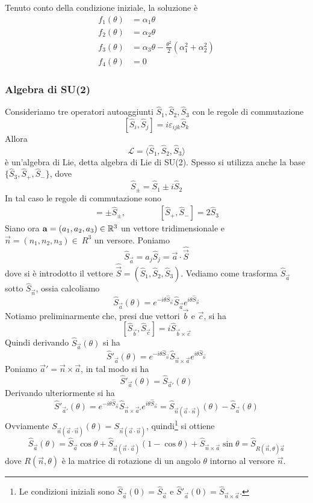 \documentclass[a4paper, 11pt]{article}
\newcommand{\op}[1]{\hat{#1}}
\renewcommand{\op}[1]{\hat{#1}}
\begin{document}
Tenuto conto della condizione iniziale, la soluzione è
\begin{align*}
	f_1(\theta)&=\alpha_1\theta\\f_2(\theta)&=\alpha_2\theta\\f_3(\theta)&=\alpha_3\theta-\frac{\theta^2}{2}(\alpha_1^2+\alpha_2^2)\\f_4(\theta)&=0
\end{align*}
\subsubsection{Algebra di SU(2)}
Consideriamo tre operatori autoaggiunti $\op S_1,\op S_2,\op S_3$ con le regole di commutazione
\[[\op S_i,\op S_j]=i\varepsilon_{ijk}\op S_k\]
Allora
\[\mathcal{L}=\langle\op S_1,\op S_2,\op S_3\rangle\]
è un'algebra di Lie, detta algebra di Lie di SU(2). Spesso si utilizza anche la base $\{\op S_3,\op S_+,\op S_-\}$, dove
\[\op S_\pm=\op S_1\pm i\op S_2\]
In tal caso le regole di commutazione sono
\begin{align*}
	[\op S_3,\op S_\pm]=\pm\op S_\pm,\qquad\qquad [\op S_+,\op S_-]=2\op S_3
\end{align*}
Siano ora $\mathbf{a}=(a_1,a_2,a_3)\in\mathbb{R} ^3$ un vettore tridimensionale e $\vec{n}=(n_1,n_2,n_3)\in\ R^3$ un versore. Poniamo
\[\op S_\vec{a}=a_j\op S_j=\vec{a}\cdot\op{\vec{S}}\]
dove si è introdotto il vettore $\op{\vec{S}}=(\op S_1,\op S_2,\op S_3)$. Vediamo come trasforma $\op S_\vec{a}$ sotto $\op S_\vec{n}$, ossia calcoliamo
\[\op S_\vec{a}(\theta)=e^{-i\theta\op S_\vec{n}}\op S_\vec{a}e^{i\theta\op S_\vec{n}}\]
Notiamo preliminarmente che, presi due vettori $\vec{b}$ e $\vec{c}$, si ha
\[[\op S_\vec{b},\op S_\vec{c}]=i\op S_{\vec{b}\times\vec{c}}\]
Quindi derivando $\op S_\vec{a}(\theta)$ si ha
\[\op S'_\vec{a}(\theta)=e^{-i\theta\op S_\vec{n}}\op{S}_{\vec{n}\times\vec{a}}e^{i\theta\op S_\vec{n}}\]
Poniamo $\vec{a}'=\vec{n}\times\vec{a}$, in tal modo si ha
\[\op S'_\vec{a}(\theta)=\op S_{\vec{a}'}(\theta)\]
Derivando ulteriormente si ha
\[\op S'_{\vec{a}'}(\theta)=e^{-i\theta\op S_\vec{n}}\op S_{\vec{n}\times\vec{a}'}e^{i\theta\op S_\vec{n}}=\op S_{\vec{n}(\vec{a}\cdot\vec{n})}(\theta)-\op S_\vec{a}(\theta)\]
Ovviamente $S_{\vec{n}(\vec{a}\cdot\vec{n})}(\theta)=S_{\vec{n}(\vec{a}\cdot\vec{n})}$, quindi\footnote{Le condizioni iniziali sono $\op S_\vec{a}(0)=\op S_\vec{a}$ e $\op S'_\vec{a}(0)=\op S_{\vec{n}\times\vec{a}}$.} si ottiene
\[\op S_\vec{a}(\theta)=\op S_\vec{a}\cos\theta+\op S_{\vec{n}(\vec{n}\cdot\vec{a})}(1-\cos\theta)+\op S_{\vec{n}\times\vec{a}}\sin\theta=\op S_{R(\vec{n},\theta)\vec{a}}\]
dove $R(\vec{n},\theta)$ è la matrice di rotazione di un angolo $\theta$ intorno al versore $\vec{n}$.
\end{document}
